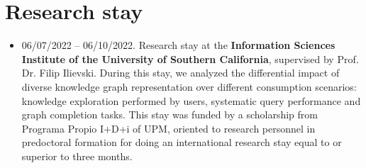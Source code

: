 \section{Research stay}
\begin{itemize}
    \item 06/07/2022 -- 06/10/2022. Research stay at the \textbf{Information Sciences Institute of the University of Southern California}, supervised by Prof. Dr. Filip Ilievski. During this stay, we analyzed the differential impact of diverse knowledge graph representation over different consumption scenarios: knowledge exploration performed by users, systematic query performance and graph completion tasks. This stay was funded by a scholarship from Programa Propio I+D+i of UPM, oriented to research personnel in predoctoral formation for doing an international research stay equal to or superior to three months.
\end{itemize}


